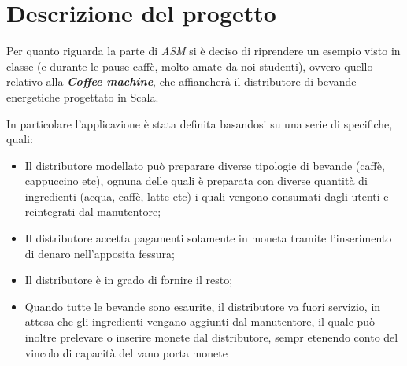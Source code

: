 \section{Descrizione del progetto}
Per quanto riguarda la parte di \textit{ASM} si è deciso di riprendere un esempio visto in classe (e durante le pause caffè, molto amate da noi studenti), ovvero quello relativo alla \textit{\textbf{Coffee machine}}, che affiancherà il distributore di bevande energetiche progettato in Scala.

In particolare l'applicazione è stata definita basandosi su una serie di specifiche, quali:
\begin{itemize}
	\item Il distributore modellato può preparare diverse tipologie di bevande (caffè, cappuccino etc), ognuna delle quali è preparata con diverse quantità di ingredienti (acqua, caffè, latte etc) i quali vengono consumati dagli utenti e reintegrati dal manutentore;
	\item Il distributore accetta pagamenti solamente in moneta tramite l'inserimento di denaro nell'apposita fessura;
	\item Il distributore è in grado di fornire il resto;
	\item Quando tutte le bevande sono esaurite, il distributore va fuori servizio, in attesa che gli ingredienti vengano aggiunti dal manutentore, il quale può inoltre prelevare o inserire monete dal distributore, sempr etenendo conto del vincolo di capacità del vano porta monete
\end{itemize}
	


